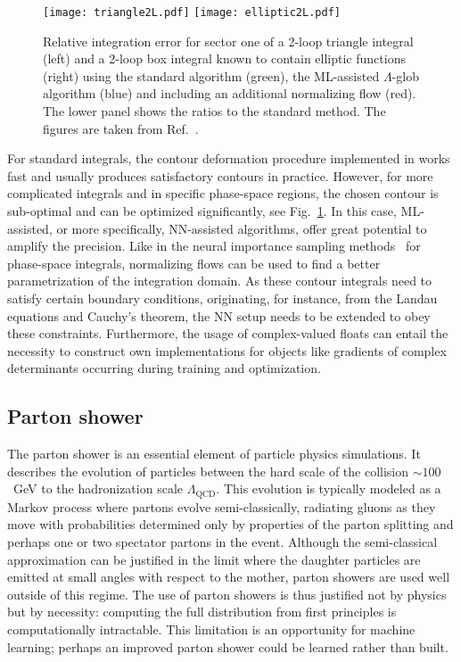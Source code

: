 \documentclass[submission,Phys]{SciPost}
\begin{document}
\begin{figure}[t]
  \texttt{[image: triangle2L.pdf]}
  \texttt{[image: elliptic2L.pdf]}
  \caption{Relative integration error for sector one of a 2-loop  triangle integral (left) and a 2-loop box integral known to contain elliptic functions (right) using the standard \pysecdec algorithm (green), the ML-assisted $\Lambda$-glob algorithm (blue) and including an additional normalizing flow (red). The lower panel shows the ratios to the standard method. The figures are taken from Ref.~\cite{Winterhalder:2021ngy}.}
  \label{fig:triangle_elliptic}
\end{figure}

For standard integrals, the contour deformation procedure implemented in \pysecdec works fast and usually produces satisfactory contours in practice. However, for more complicated integrals and in specific phase-space regions, the chosen contour is sub-optimal and can be optimized significantly, see Fig.~\ref{fig:triangle_elliptic}. In this case, ML-assisted, or more specifically, NN-assisted algorithms, offer great potential to amplify the precision. Like in the neural importance sampling methods~\cite{Bothmann:2020ywa,Gao:2020vdv,Gao:2020zvv,Verheyen:2020bjw} for phase-space integrals, normalizing flows can be used to find a better parametrization of the integration domain. As these contour integrals need to satisfy certain boundary conditions, originating, for instance, from the Landau equations and Cauchy’s theorem, the NN setup needs to be extended to obey these constraints. Furthermore, the usage of complex-valued floats can entail the necessity to construct own implementations for objects like gradients of complex determinants occurring during training and optimization.

\subsection{Parton shower}
\label{sec:generators_shower}

The parton shower is an essential element of particle physics simulations. It describes the evolution of particles between the hard scale of the collision $\sim 100$~GeV to the hadronization scale $\Lambda_\text{QCD}$. This evolution is typically modeled as a Markov process where partons evolve semi-classically, radiating gluons as they move with probabilities determined only by properties of the parton splitting and perhaps one or two spectator partons in the event. Although the semi-classical approximation can be justified in the limit where the daughter particles are emitted at small angles with respect to the mother, parton showers are used well outside of this regime. The use of parton showers is thus justified not by physics but by necessity: computing the full distribution from first principles is computationally intractable. This limitation is an opportunity for machine learning; perhaps an improved parton shower could be learned rather than built.
\end{document}

